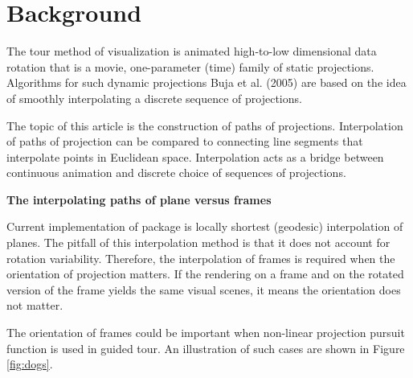 \hypertarget{background}{%
\section{Background}\label{background}}

The tour method of visualization is animated high-to-low dimensional data rotation that is a movie, one-parameter (time) family of static projections. Algorithms for such dynamic projections Buja et al. (2005) are based on the idea of smoothly interpolating a discrete sequence of projections.

The topic of this article is the construction of paths of projections. Interpolation of paths of projection can be compared to connecting line segments that interpolate points in Euclidean space. Interpolation acts as a bridge between continuous animation and discrete choice of sequences of projections.

\textbf{The interpolating paths of plane versus frames}

Current implementation of  package is locally shortest (geodesic) interpolation of planes. The pitfall of this interpolation method is that it does not account for rotation variability. Therefore, the interpolation of frames is required when the orientation of projection matters. If the rendering on a frame and on the rotated version of the frame yields the same visual scenes, it means the orientation does not matter.

The orientation of frames could be important when non-linear projection pursuit function is used in guided tour. An illustration of such cases are shown in Figure \ref{fig:dogs}.

